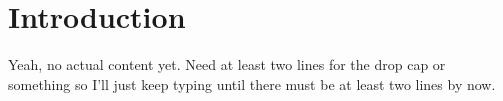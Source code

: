 \section{Introduction}

  Yeah, no actual content yet.  Need at least two lines for the drop cap or
  something so I'll just keep typing until there must be at least two lines by
  now. \cite{yeah,lol}

